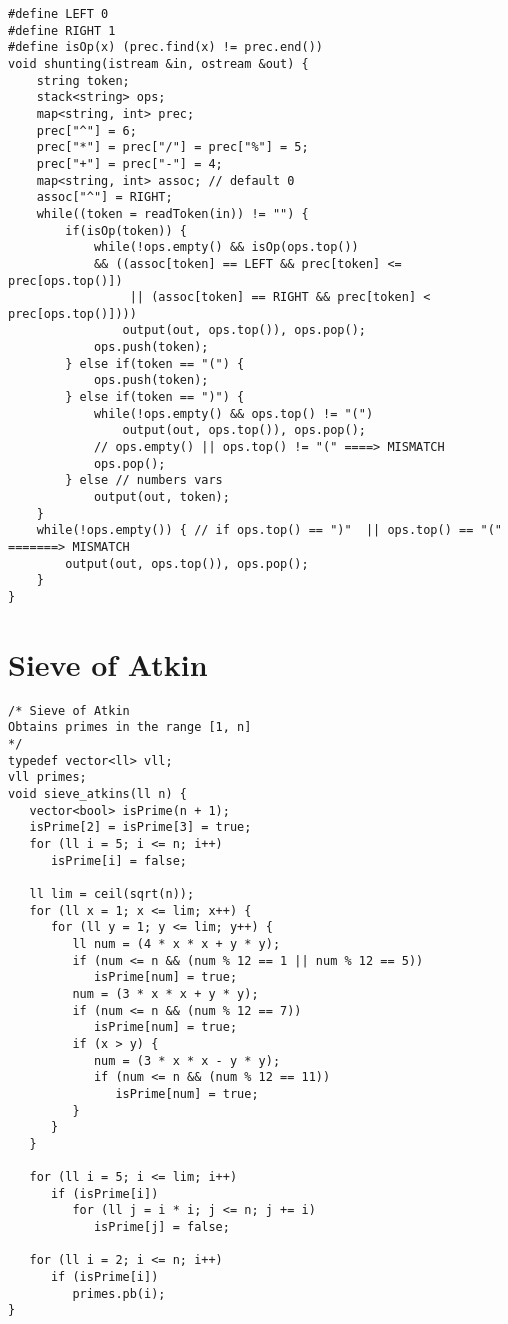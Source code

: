 \documentclass[8pt, oneside]{extarticle}
\begin{document}
\begin{multicols}{3}
\begin{lstlisting}
#define LEFT 0
#define RIGHT 1
#define isOp(x) (prec.find(x) != prec.end())
void shunting(istream &in, ostream &out) {
    string token;
    stack<string> ops;
    map<string, int> prec;
    prec["^"] = 6;
    prec["*"] = prec["/"] = prec["%"] = 5;
    prec["+"] = prec["-"] = 4;
    map<string, int> assoc; // default 0
    assoc["^"] = RIGHT;
    while((token = readToken(in)) != "") {
        if(isOp(token)) {
            while(!ops.empty() && isOp(ops.top())
            && ((assoc[token] == LEFT && prec[token] <= prec[ops.top()]) 
                 || (assoc[token] == RIGHT && prec[token] < prec[ops.top()])))
                output(out, ops.top()), ops.pop();
            ops.push(token);
        } else if(token == "(") {
            ops.push(token);
        } else if(token == ")") {
            while(!ops.empty() && ops.top() != "(")
                output(out, ops.top()), ops.pop();
            // ops.empty() || ops.top() != "(" ====> MISMATCH
            ops.pop();
        } else // numbers vars
            output(out, token);
    }
    while(!ops.empty()) { // if ops.top() == ")"  || ops.top() == "(" =======> MISMATCH
        output(out, ops.top()), ops.pop(); 
    }
}
\end{lstlisting}

\section{Sieve of Atkin}

\begin{lstlisting}
/* Sieve of Atkin
Obtains primes in the range [1, n]
*/
typedef vector<ll> vll;
vll primes;
void sieve_atkins(ll n) {
   vector<bool> isPrime(n + 1);
   isPrime[2] = isPrime[3] = true;
   for (ll i = 5; i <= n; i++)
      isPrime[i] = false;

   ll lim = ceil(sqrt(n));
   for (ll x = 1; x <= lim; x++) {
      for (ll y = 1; y <= lim; y++) {
         ll num = (4 * x * x + y * y);
         if (num <= n && (num % 12 == 1 || num % 12 == 5))
            isPrime[num] = true;
         num = (3 * x * x + y * y);
         if (num <= n && (num % 12 == 7))
            isPrime[num] = true;
         if (x > y) {
            num = (3 * x * x - y * y);
            if (num <= n && (num % 12 == 11))
               isPrime[num] = true;
         }
      }
   }

   for (ll i = 5; i <= lim; i++)
      if (isPrime[i])
         for (ll j = i * i; j <= n; j += i)
            isPrime[j] = false;

   for (ll i = 2; i <= n; i++)
      if (isPrime[i])
         primes.pb(i);
}
\end{lstlisting}


\end{multicols}
\end{document}
